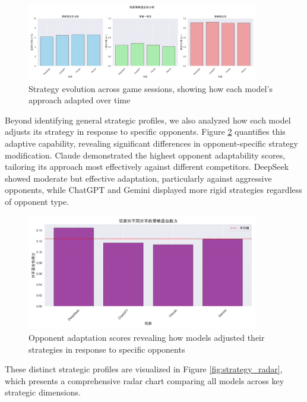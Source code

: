 \documentclass{article}
\begin{document}
\begin{figure}[H]
    \centering
    \includegraphics[width=0.9\textwidth]{figures/strategy_evolution.png}
    \caption{Strategy evolution across game sessions, showing how each model's approach adapted over time}
    \label{fig:strategy_evolution}
\end{figure}

Beyond identifying general strategic profiles, we also analyzed how each model adjusts its strategy in response to specific opponents. Figure \ref{fig:opponent_adaptation} quantifies this adaptive capability, revealing significant differences in opponent-specific strategy modification. Claude demonstrated the highest opponent adaptability scores, tailoring its approach most effectively against different competitors. DeepSeek showed moderate but effective adaptation, particularly against aggressive opponents, while ChatGPT and Gemini displayed more rigid strategies regardless of opponent type.

\begin{figure}[H]
    \centering
    \includegraphics[width=0.9\textwidth]{figures/opponent_adaptation_scores.png}
    \caption{Opponent adaptation scores revealing how models adjusted their strategies in response to specific opponents}
    \label{fig:opponent_adaptation}
\end{figure}

These distinct strategic profiles are visualized in Figure \ref{fig:strategy_radar}, which presents a comprehensive radar chart comparing all models across key strategic dimensions.
\end{document}
